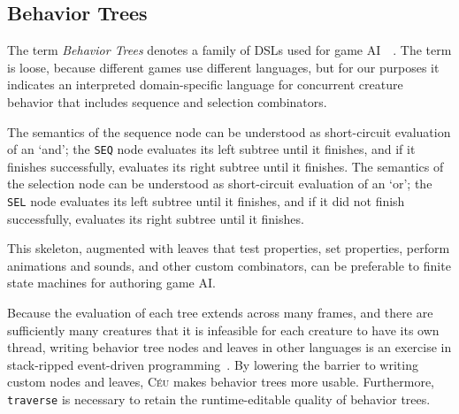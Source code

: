 \documentclass{acm_proc_article-sp}
\newcommand{\CEU}{\textsc{C\'{e}u}\xspace}
\newcommand{\code}[1] {{\small{\texttt{#1}}}}
\begin{document}

\subsection{Behavior Trees}

The term \emph{Behavior Trees} denotes a family of DSLs used for game 
AI~\cite{isla2005}~\cite{hecker2009my}.
The term is loose, because different games use different languages,
but for our purposes it indicates an interpreted domain-specific language
for concurrent creature behavior that includes sequence and selection combinators.

The semantics of the sequence node can be understood as short-circuit evaluation of an `and';
the \code{SEQ} node evaluates its left subtree until it finishes,
and if it finishes successfully, evaluates its right subtree until it finishes.
The semantics of the selection node can be understood as short-circuit evaluation of an `or';
the \code{SEL} node evaluates its left subtree until it finishes,
and if it did not finish successfully, evaluates its right subtree until it finishes.

This skeleton, augmented with leaves that test properties, set properties, perform animations and sounds,
and other custom combinators, can be preferable to finite state machines for authoring game AI.

Because the evaluation of each tree extends across many frames,
and there are sufficiently many creatures that it is infeasible for each creature to have its own thread,
writing behavior tree nodes and leaves in other languages is an exercise in stack-ripped event-driven programming~\cite{krohn2007events}.
By lowering the barrier to writing custom nodes and leaves, \CEU makes behavior trees more usable.
Furthermore, \code{traverse} is necessary to retain the runtime-editable quality of behavior trees.
\end{document}
